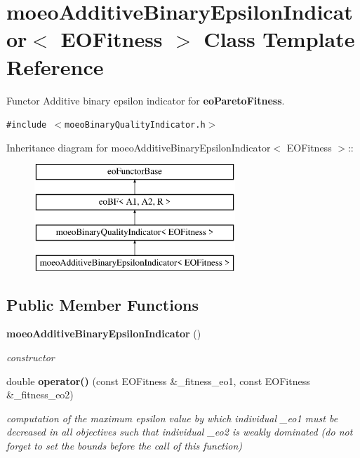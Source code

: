 \section{moeo\-Additive\-Binary\-Epsilon\-Indicator$<$ EOFitness $>$ Class Template Reference}
\label{classmoeoAdditiveBinaryEpsilonIndicator}
Functor Additive binary epsilon indicator for {\bf eo\-Pareto\-Fitness}.  


{\tt \#include $<$moeo\-Binary\-Quality\-Indicator.h$>$}

Inheritance diagram for moeo\-Additive\-Binary\-Epsilon\-Indicator$<$ EOFitness $>$::\begin{figure}[H]
\begin{center}
\leavevmode
\includegraphics[height=4cm]{classmoeoAdditiveBinaryEpsilonIndicator}
\end{center}
\end{figure}
\subsection*{Public Member Functions}
\begin{CompactItemize}
\item 
{\bf moeo\-Additive\-Binary\-Epsilon\-Indicator} ()\label{classmoeoAdditiveBinaryEpsilonIndicator_d26af04a8276654998b4425f97963c47}

\begin{CompactList}\small\item\em constructor \item\end{CompactList}\item 
double {\bf operator()} (const EOFitness \&\_\-fitness\_\-eo1, const EOFitness \&\_\-fitness\_\-eo2)
\begin{CompactList}\small\item\em computation of the maximum epsilon value by which individual \_\-eo1 must be decreased in all objectives such that individual \_\-eo2 is weakly dominated (do not forget to set the bounds before the call of this function) \item\end{CompactList}\end{CompactItemize}
